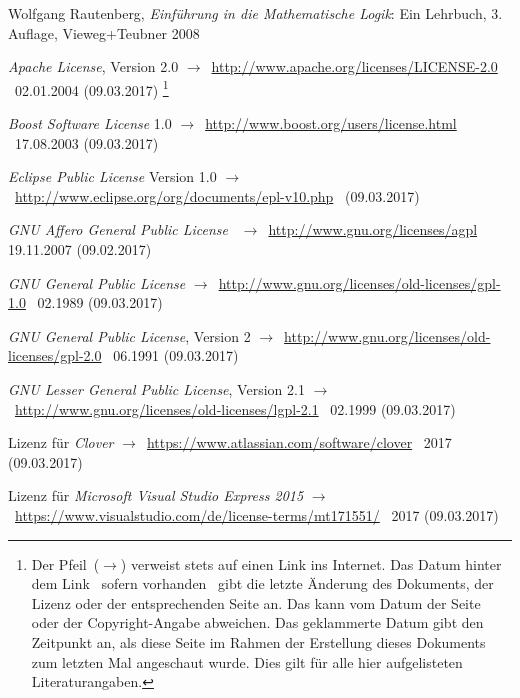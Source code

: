 \documentclass[english,ngerman,parskip=half,headsepline,footsepline]{scrreprt}
\begin{document}
	\begin{flushleft}
		\begin{thebibliography}{12}
			\ihead{\textnormal{\textsf{\textbf{\bibname}}}}
			\thispagestyle{scrheadings}

			Wolfgang Rautenberg, \emph{Einführung in die Mathematische Logik}: Ein Lehrbuch, 3. Auflage, Vieweg+Teubner 2008

			\emph{Apache License}, Version 2.0 $\rightarrow$~\url{http://www.apache.org/licenses/LICENSE-2.0} \textendash\ 02.01.2004 (09.03.2017)
			\footnote{Der Pfeil~($\rightarrow$) verweist stets auf einen Link ins Internet. Das Datum hinter dem Link \textendash\ sofern vorhanden \textendash\ gibt die letzte Änderung des Dokuments, der Lizenz oder der entsprechenden Seite an. Das kann vom Datum der Seite oder der Copyright-Angabe abweichen. Das geklammerte Datum gibt den Zeitpunkt an, als diese Seite im Rahmen der Erstellung dieses Dokuments zum letzten Mal angeschaut wurde. Dies gilt für alle hier aufgelisteten Literaturangaben.}

			\emph{Boost Software License} 1.0 $\rightarrow$~\url{http://www.boost.org/users/license.html} \textendash\ 17.08.2003 (09.03.2017)

			\emph{Eclipse Public License} Version 1.0 $\rightarrow$~\url{http://www.eclipse.org/org/documents/epl-v10.php} \textendash\ (09.03.2017)

			\emph{GNU Affero General Public License} \textendash\ $\rightarrow$~\url{http://www.gnu.org/licenses/agpl} 19.11.2007 (09.02.2017)

			\emph{GNU General Public License} $\rightarrow$~\url{http://www.gnu.org/licenses/old-licenses/gpl-1.0} \textendash\ 02.1989 (09.03.2017)

			\emph{GNU General Public License}, Version 2 $\rightarrow$~\url{http://www.gnu.org/licenses/old-licenses/gpl-2.0} \textendash\ 06.1991 (09.03.2017)

			\emph{GNU Lesser General Public License}, Version 2.1 $\rightarrow$~\url{http://www.gnu.org/licenses/old-licenses/lgpl-2.1} \textendash\ 02.1999 (09.03.2017)

			Lizenz für \emph{Clover} $\rightarrow$~\url{https://www.atlassian.com/software/clover} \textendash\ 2017 (09.03.2017)

			Lizenz für \emph{Microsoft Visual Studio Express 2015} $\rightarrow$~\url{https://www.visualstudio.com/de/license-terms/mt171551/} \textendash\ 2017 (09.03.2017)


\end{thebibliography}
\end{flushleft}
\end{document}

